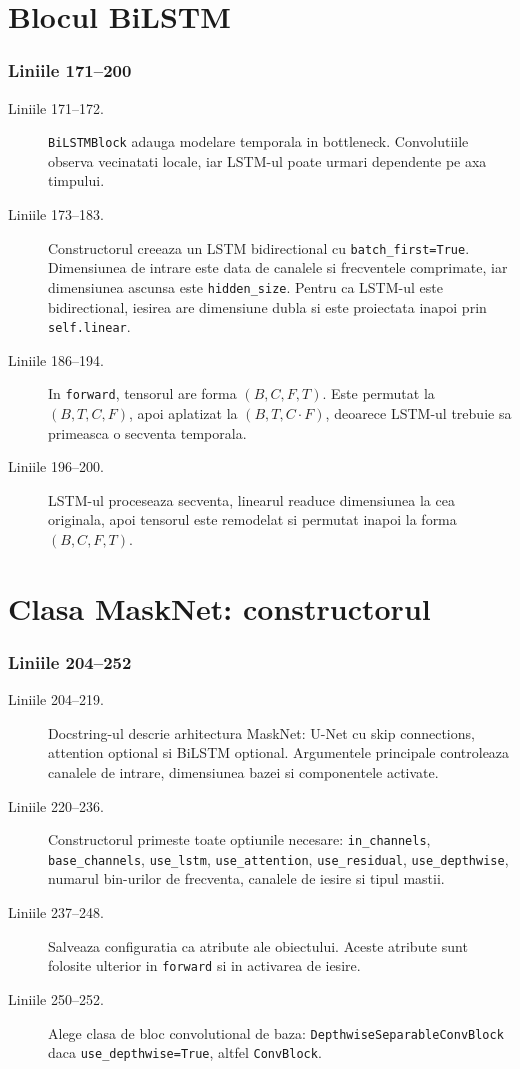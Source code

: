\documentclass[12pt,a4paper]{report}
\newcommand{\codechunk}[2]{%
\subsection*{Liniile #1--#2}

}
\begin{document}
\chapter{Blocul BiLSTM}

\codechunk{171}{200}

\begin{description}
    \item[Liniile 171--172.] \texttt{BiLSTMBlock} adauga modelare temporala in
    bottleneck. Convolutiile observa vecinatati locale, iar LSTM-ul poate urmari
    dependente pe axa timpului.

    \item[Liniile 173--183.] Constructorul creeaza un LSTM bidirectional cu
    \texttt{batch\_first=True}. Dimensiunea de intrare este data de canalele si
    frecventele comprimate, iar dimensiunea ascunsa este \texttt{hidden\_size}.
    Pentru ca LSTM-ul este bidirectional, iesirea are dimensiune dubla si este
    proiectata inapoi prin \texttt{self.linear}.

    \item[Liniile 186--194.] In \texttt{forward}, tensorul are forma
    \((B,C,F,T)\). Este permutat la \((B,T,C,F)\), apoi aplatizat la
    \((B,T,C\cdot F)\), deoarece LSTM-ul trebuie sa primeasca o secventa temporala.

    \item[Liniile 196--200.] LSTM-ul proceseaza secventa, linearul readuce dimensiunea
    la cea originala, apoi tensorul este remodelat si permutat inapoi la forma
    \((B,C,F,T)\).
\end{description}

\chapter{Clasa MaskNet: constructorul}

\codechunk{204}{252}

\begin{description}
    \item[Liniile 204--219.] Docstring-ul descrie arhitectura MaskNet: U-Net cu
    skip connections, attention optional si BiLSTM optional. Argumentele principale
    controleaza canalele de intrare, dimensiunea bazei si componentele activate.

    \item[Liniile 220--236.] Constructorul primeste toate optiunile necesare:
    \texttt{in\_channels}, \texttt{base\_channels}, \texttt{use\_lstm},
    \texttt{use\_attention}, \texttt{use\_residual}, \texttt{use\_depthwise},
    numarul bin-urilor de frecventa, canalele de iesire si tipul mastii.

    \item[Liniile 237--248.] Salveaza configuratia ca atribute ale obiectului.
    Aceste atribute sunt folosite ulterior in \texttt{forward} si in activarea de
    iesire.

    \item[Liniile 250--252.] Alege clasa de bloc convolutional de baza:
    \texttt{DepthwiseSeparableConvBlock} daca \texttt{use\_depthwise=True}, altfel
    \texttt{ConvBlock}.
\end{description}
\end{document}
